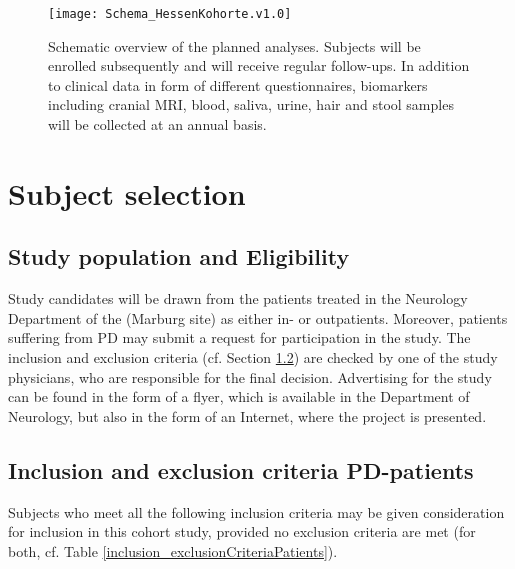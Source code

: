 \begin{figure}[h]
\label{fig2:scheme}
\centering
\texttt{[image: Schema\_HessenKohorte.v1.0]}
\caption{Schematic overview of the planned analyses. Subjects will be enrolled subsequently and will receive regular follow-ups. In addition to clinical data in form of different questionnaires, biomarkers including cranial \ac{MRI}, blood, saliva, urine, hair and stool samples will be collected at an annual basis.}
\end{figure}

\section{Subject selection}
\label{sec:study_selection}
\subsection{Study population and Eligibility}
\label{sec:study_population}
Study candidates will be drawn from the patients treated in the Neurology Department of the \UKGM (Marburg site) as either in- or outpatients. Moreover, patients suffering from \ac{PD} may submit a request for participation in the study. The inclusion and exclusion criteria (cf. Section \ref{sec:inclusion_criteriaIPS}) are checked by one of the study physicians, who are responsible for the final decision. Advertising for the study can be found in the form of a flyer, which is available in the Department of Neurology, but also in the form of an Internet, where the project is presented.

\subsection{Inclusion and exclusion criteria \ac{PD}-patients}
\label{sec:inclusion_criteriaIPS}
Subjects who meet all the following inclusion criteria may be given consideration for inclusion in this cohort study, provided no exclusion criteria are met (for both, cf. Table \ref{inclusion_exclusionCriteriaPatients}).

